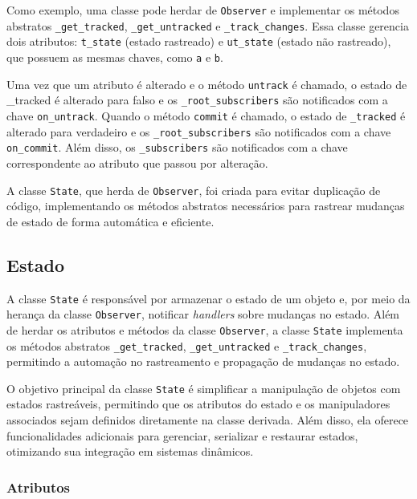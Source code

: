 Como exemplo, uma classe pode herdar de \texttt{Observer} e implementar os métodos abstratos \texttt{\_get\_tracked}, \texttt{\_get\_untracked} e \texttt{\_track\_changes}. Essa classe gerencia dois atributos: \texttt{t\_state} (estado rastreado) e \texttt{ut\_state} (estado não rastreado), que possuem as mesmas chaves, como \texttt{a} e \texttt{b}.

Uma vez que um atributo é alterado e o método \texttt{untrack} é chamado, o estado de \_tracked é alterado para falso e os \texttt{\_root\_subscribers} são notificados com a chave \texttt{on\_untrack}. Quando o método \texttt{commit} é chamado, o estado de \texttt{\_tracked} é alterado para verdadeiro e os \texttt{\_root\_subscribers} são notificados com a chave \texttt{on\_commit}. Além disso, os \texttt{\_subscribers} são notificados com a chave correspondente ao atributo que passou por alteração.

A classe \texttt{State}, que herda de \texttt{Observer}, foi criada para evitar duplicação de código, implementando os métodos abstratos necessários para rastrear mudanças de estado de forma automática e eficiente.

\subsection{Estado}

A classe \texttt{State} é responsável por armazenar o estado de um objeto e, por meio da herança da classe \texttt{Observer}, notificar \textit{handlers} sobre mudanças no estado. Além de herdar os atributos e métodos da classe \texttt{Observer}, a classe \texttt{State} implementa os métodos abstratos \texttt{\_get\_tracked}, \texttt{\_get\_untracked} e \texttt{\_track\_changes}, permitindo a automação no rastreamento e propagação de mudanças no estado.

O objetivo principal da classe \texttt{State} é simplificar a manipulação de objetos com estados rastreáveis, permitindo que os atributos do estado e os manipuladores associados sejam definidos diretamente na classe derivada. Além disso, ela oferece funcionalidades adicionais para gerenciar, serializar e restaurar estados, otimizando sua integração em sistemas dinâmicos.

\subsubsection{Atributos}

